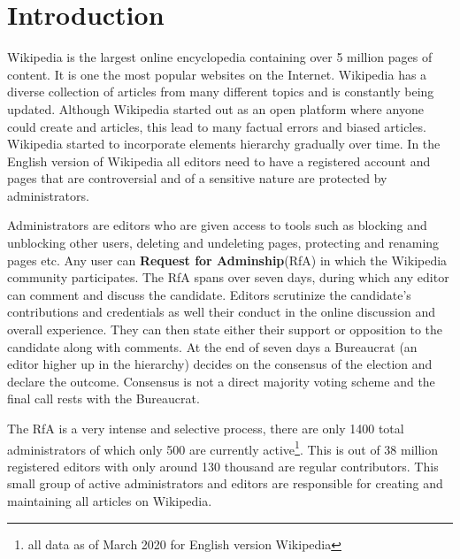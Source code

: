 \section{Introduction}
\label{sec:introduction}

Wikipedia is the largest online encyclopedia containing over 5 million pages of content. It is one the most popular websites on the Internet. Wikipedia has a diverse collection of articles from many different topics and is constantly being updated. Although Wikipedia started out as an open platform where anyone could create and articles, this lead to many factual errors and biased articles. Wikipedia started to incorporate elements hierarchy gradually over time. In the English version of Wikipedia all editors need to have a registered account and pages that are controversial and of a sensitive nature are protected by administrators.

Administrators are editors who are given access to tools such as blocking and unblocking other users, deleting and undeleting pages, protecting and renaming pages etc. Any user can \textbf{Request for Adminship}(RfA) in which the Wikipedia community participates. The RfA spans over seven days, during which any editor can comment and discuss the candidate. Editors scrutinize the candidate's contributions and credentials as well their conduct in the online discussion and overall experience. They can then state either their support or opposition to the candidate along with comments. At the end of seven days a Bureaucrat (an editor higher up in the hierarchy) decides on the consensus of the election and declare the outcome. Consensus is not a direct majority voting scheme and the final call rests with the Bureaucrat.

The RfA is a very intense and selective process, there are only 1400 total administrators of which only 500 are currently active\footnote{all data as of March 2020 for English version Wikipedia}. This is out of 38 million registered editors with only around 130 thousand are regular contributors. This small group of active administrators and editors are responsible for creating and maintaining all articles on Wikipedia.

